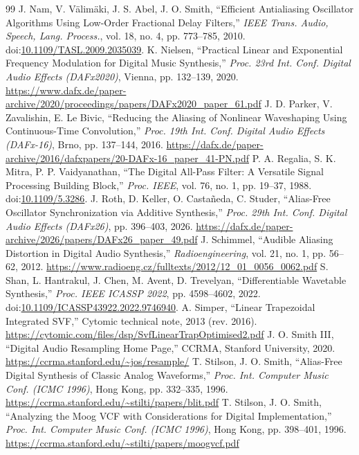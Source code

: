 \documentclass[conference]{IEEEtran}
\begin{document}
\begin{thebibliography}{99}
 J. Nam, V. Välimäki, J. S. Abel, J. O. Smith, ``Efficient Antialiasing Oscillator Algorithms Using Low-Order Fractional Delay Filters,'' \emph{IEEE Trans. Audio, Speech, Lang. Process.}, vol. 18, no. 4, pp. 773–785, 2010. doi:\href{https://doi.org/10.1109/TASL.2009.2035039}{10.1109/TASL.2009.2035039}.
 K. Nielsen, ``Practical Linear and Exponential Frequency Modulation for Digital Music Synthesis,'' \emph{Proc. 23rd Int. Conf. Digital Audio Effects (DAFx2020)}, Vienna, pp. 132–139, 2020. \url{https://www.dafx.de/paper-archive/2020/proceedings/papers/DAFx2020_paper_61.pdf}
 J. D. Parker, V. Zavalishin, E. Le Bivic, ``Reducing the Aliasing of Nonlinear Waveshaping Using Continuous-Time Convolution,'' \emph{Proc. 19th Int. Conf. Digital Audio Effects (DAFx-16)}, Brno, pp. 137–144, 2016. \url{https://dafx.de/paper-archive/2016/dafxpapers/20-DAFx-16_paper_41-PN.pdf}
 P. A. Regalia, S. K. Mitra, P. P. Vaidyanathan, ``The Digital All-Pass Filter: A Versatile Signal Processing Building Block,'' \emph{Proc. IEEE}, vol. 76, no. 1, pp. 19–37, 1988. doi:\href{https://doi.org/10.1109/5.3286}{10.1109/5.3286}.
 J. Roth, D. Keller, O. Castañeda, C. Studer, ``Alias-Free Oscillator Synchronization via Additive Synthesis,'' \emph{Proc. 29th Int. Conf. Digital Audio Effects (DAFx26)}, pp. 396–403, 2026. \url{https://dafx.de/paper-archive/2026/papers/DAFx26_paper_49.pdf}
 J. Schimmel, ``Audible Aliasing Distortion in Digital Audio Synthesis,'' \emph{Radioengineering}, vol. 21, no. 1, pp. 56–62, 2012. \url{https://www.radioeng.cz/fulltexts/2012/12_01_0056_0062.pdf}
 S. Shan, L. Hantrakul, J. Chen, M. Avent, D. Trevelyan, ``Differentiable Wavetable Synthesis,'' \emph{Proc. IEEE ICASSP 2022}, pp. 4598–4602, 2022. doi:\href{https://doi.org/10.1109/ICASSP43922.2022.9746940}{10.1109/ICASSP43922.2022.9746940}.
 A. Simper, ``Linear Trapezoidal Integrated SVF,'' Cytomic technical note, 2013 (rev. 2016). \url{https://cytomic.com/files/dsp/SvfLinearTrapOptimised2.pdf}
 J. O. Smith III, ``Digital Audio Resampling Home Page,'' CCRMA, Stanford University, 2020. \url{https://ccrma.stanford.edu/~jos/resample/}
 T. Stilson, J. O. Smith, ``Alias-Free Digital Synthesis of Classic Analog Waveforms,'' \emph{Proc. Int. Computer Music Conf. (ICMC 1996)}, Hong Kong, pp. 332–335, 1996. \url{https://ccrma.stanford.edu/~stilti/papers/blit.pdf}
 T. Stilson, J. O. Smith, ``Analyzing the Moog VCF with Considerations for Digital Implementation,'' \emph{Proc. Int. Computer Music Conf. (ICMC 1996)}, Hong Kong, pp. 398–401, 1996. \url{https://ccrma.stanford.edu/~stilti/papers/moogvcf.pdf}

\end{thebibliography}
\end{document}

